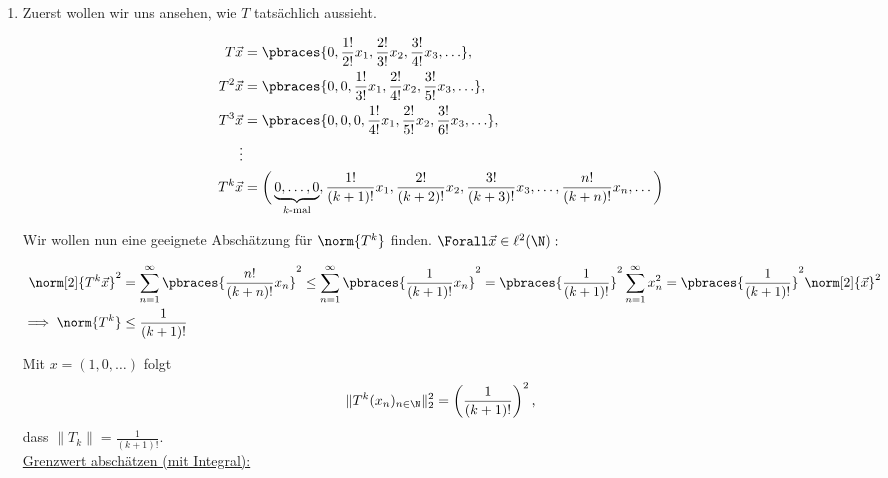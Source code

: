 \begin{solution}

\phantom{}

\begin{enumerate}[label = (\alph*)]

  \item
  Zuerst wollen wir uns ansehen, wie $T$ tatsächlich aussieht.

  \begin{align*}
    T \vec x
    & =
    \pbraces
    {
      0,
      \frac{1!}{2!} x_1,
      \frac{2!}{3!} x_2,
      \frac{3!}{4!} x_3,
      \ldots
    }, \\
    T^2 \vec x
    & =
    \pbraces
    {
      0, 0,
      \frac{1!}{3!} x_1,
      \frac{2!}{4!} x_2,
      \frac{3!}{5!} x_3,
      \ldots
    }, \\
    T^3 \vec x
    & =
    \pbraces
    {
      0, 0, 0,
      \frac{1!}{4!} x_1,
      \frac{2!}{5!} x_2,
      \frac{3!}{6!} x_3,
      \ldots
    }, \\
    \vdots \\
    T^k \vec x
    & =
    \bigg (
      \underbrace{0, \ldots, 0}_{k \text{-mal}},
      \frac{1!}{(k+1)!} x_1,
      \frac{2!}{(k+2)!} x_2,
      \frac{3!}{(k+3)!} x_3,
      \ldots,
      \frac{n!}{(k+n)!} x_n,
      \ldots
    \bigg )
  \end{align*}

  Wir wollen nun eine geeignete Abschätzung für $\norm{T^k}$ finden.
  $\Forall \vec x \in \ell^2(\N):$

  \begin{align*}
    \norm[2]{T^k \vec x}^2
    & =
    \sum_{n=1}^\infty
    \pbraces
    {
      \frac{n!}{(k+n)!}
      x_n
    }^2
    \leq
    \sum_{n=1}^\infty
    \pbraces
    {
      \frac{1}{(k+1)!}
      x_n
    }^2
    =
    \pbraces{\frac{1}{(k+1)!}}^2
    \sum_{n=1}^\infty x_n^2
    =
    \pbraces{\frac{1}{(k+1)!}}^2
    \norm[2]{\vec x}^2 \\
    \implies
    \norm{T^k}
    & \leq
    \frac{1}{(k+1)!}
  \end{align*}

  Mit $x = (1,0,\dots)$ folgt
  \begin{align*}
    \|T^k(x_n)_{n \in \N}\|_2^2 = \left(\frac{1}{(k+1)!}\right)^2,
  \end{align*}
  dass $\|T_k\| = \frac{1}{(k+1)!}$. \\

  \underline{Grenzwert abschätzen (mit Integral):} \\


\end{enumerate}
\end{solution}
